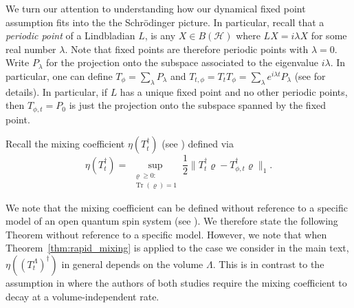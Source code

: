 \documentclass{article}
\DeclareMathOperator{\Tr}{Tr}
\newcommand{\<}{\langle}
\renewcommand{\>}{\rangle}
\numberwithin{equation}{section}
\theoremstyle{definition}
\begin{document}
We turn our attention to understanding how our dynamical fixed point assumption fits into the the Schr\"odinger picture. In particular, recall that a \textit{periodic point} of a Lindbladian $L$, is any $X\in B(\mathcal{H})$ where $LX = i \lambda X$ for some real number $\lambda$. Note that fixed points are therefore periodic points with $\lambda = 0$. Write $P_\lambda$ for the projection onto the subspace associated to the eigenvalue $i\lambda$. In particular, one can define $T_\phi = \sum_{\lambda} P_\lambda$ and $T_{t,\phi} = T_t T_\phi = \sum_{\lambda} e^{i\lambda t}P_\lambda$ (see \cite{Cubitt,Wolf} for details). In particular, if $L$ has a unique fixed point and no other periodic points, then $T_{\phi, t} = P_0$ is just the projection onto the subspace spanned by the fixed point. 

Recall the mixing coefficient $\eta(T^\dagger_t)$  (see \cite{Brandao, Cubitt, Kastoryano_et_al, Temme_et_al}) defined via
	\begin{equation}
		\eta(T^{\dagger}_t) = \sup_{\substack{\varrho \ge 0:\\ \Tr(\varrho) = 1}} \frac{1}{2} \|T^{\dagger}_t \varrho - T^{\dagger}_{\phi, t}\varrho \|_1. 
	\end{equation} 

We note that the mixing coefficient can be defined without reference to a specific model of an open quantum spin system (see \cite{Kastoryano_et_al, Temme_et_al}). We therefore state the following Theorem without reference to a specific model. However, we note that when Theorem~\ref{thm:rapid_mixing} is applied to the case we consider in the main text, $\eta((T_t^{\Lambda})^\dagger)$ in general depends on the volume $\Lambda$. This is in contrast to the assumption in \cite{Brandao, Cubitt} where the authors of both studies require the mixing coefficient to decay at a volume-independent rate.
\end{document}
